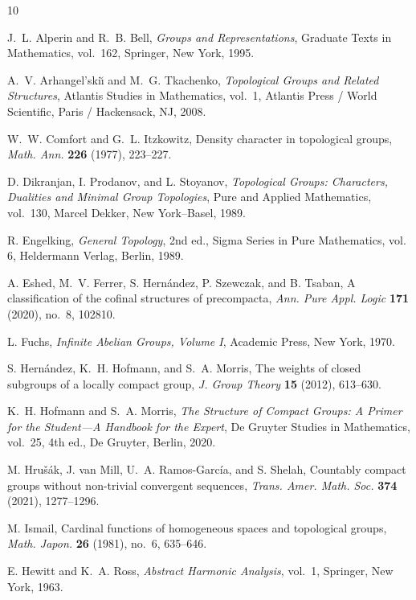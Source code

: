 \documentclass[12pt]{amsart}
\theoremstyle{definition}
\numberwithin{equation}{section}
\theoremstyle{remark}
\begin{document}
\begin{thebibliography}{10}

 J.~L. Alperin and R.~B. Bell,
\emph{Groups and Representations},
Graduate Texts in Mathematics, vol.~162, Springer, New York, 1995. 

 A.~V. Arhangel'ski\u{\i} and M.~G. Tkachenko, 
\emph{Topological Groups and Related Structures}, 
Atlantis Studies in Mathematics, vol.~1, Atlantis Press / World Scientific, Paris / Hackensack, NJ, 2008.

 W.~W. Comfort and G.~L. Itzkowitz,
Density character in topological groups,
\emph{Math. Ann.} \textbf{226} (1977), 223--227.

 D. Dikranjan, I. Prodanov, and L. Stoyanov, 
\emph{Topological Groups: Characters, Dualities and Minimal Group Topologies}, 
Pure and Applied Mathematics, vol.~130, Marcel Dekker, New York--Basel, 1989.


 R. Engelking,
{\em General Topology},
 2nd ed., Sigma Series in Pure Mathematics, vol. 6, Heldermann Verlag, Berlin, 1989.
 
A. Eshed, M.~V. Ferrer, S. Hern\'andez, P. Szewczak, and B. Tsaban,
A classification of the cofinal structures of precompacta,
\emph{Ann. Pure Appl. Logic} \textbf{171} (2020), no.~8, 102810.

 L. Fuchs,
\emph{Infinite Abelian Groups, Volume I},
Academic Press, New York, 1970.

 S. Hern\'{a}ndez, K.~H. Hofmann, and S.~A. Morris, 
The weights of closed subgroups of a locally compact group, 
\emph{J. Group Theory} \textbf{15} (2012), 613--630.

 K.~H. Hofmann and S.~A. Morris, 
\emph{The Structure of Compact Groups: A Primer for the Student---A Handbook for the Expert}, 
De Gruyter Studies in Mathematics, vol.~25, 4th ed., De Gruyter, Berlin, 2020.



 M. Hru\v{s}\'{a}k, J. van Mill, U.~A. Ramos-Garc\'{i}a, and S. Shelah, 
Countably compact groups without non-trivial convergent sequences, 
\emph{Trans. Amer. Math. Soc.} \textbf{374} (2021), 1277--1296. 

 M. Ismail,
Cardinal functions of homogeneous spaces and topological groups,
\emph{Math. Japon.} \textbf{26} (1981), no.~6, 635--646.

 E. Hewitt and K.~A. Ross,
\emph{Abstract Harmonic Analysis}, vol.~1, Springer, New York, 1963.


\end{thebibliography}
\end{document}
